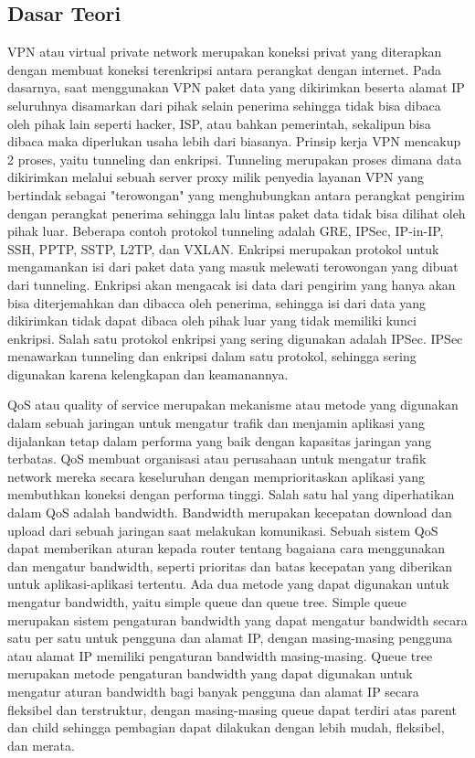 \subsection{Dasar Teori}
VPN atau virtual private network merupakan koneksi privat yang diterapkan dengan membuat koneksi terenkripsi antara perangkat dengan internet. Pada dasarnya, saat menggunakan VPN paket data yang dikirimkan beserta alamat IP seluruhnya disamarkan dari pihak selain penerima sehingga tidak bisa dibaca oleh pihak lain seperti hacker, ISP, atau bahkan pemerintah, sekalipun bisa dibaca maka diperlukan usaha lebih dari biasanya. Prinsip kerja VPN mencakup 2 proses, yaitu tunneling dan enkripsi. Tunneling merupakan proses dimana data dikirimkan melalui sebuah server proxy milik penyedia layanan VPN yang bertindak sebagai "terowongan" yang menghubungkan antara perangkat pengirim dengan perangkat penerima sehingga lalu lintas paket data tidak bisa dilihat oleh pihak luar. Beberapa contoh protokol tunneling adalah GRE, IPSec, IP-in-IP, SSH, PPTP, SSTP, L2TP, dan VXLAN. Enkripsi merupakan protokol untuk mengamankan isi dari paket data yang masuk melewati terowongan yang dibuat dari tunneling. Enkripsi akan mengacak isi data dari pengirim yang hanya akan bisa diterjemahkan dan dibacca oleh penerima, sehingga isi dari data yang dikirimkan tidak dapat dibaca oleh pihak luar yang tidak memiliki kunci enkripsi. Salah satu protokol enkripsi yang sering digunakan adalah IPSec. IPSec menawarkan tunneling dan enkripsi dalam satu protokol, sehingga sering digunakan karena kelengkapan dan keamanannya.

QoS atau quality of service merupakan mekanisme atau metode yang digunakan dalam sebuah jaringan untuk mengatur trafik dan menjamin aplikasi yang dijalankan tetap dalam performa yang baik dengan kapasitas jaringan yang terbatas. QoS membuat organisasi atau perusahaan untuk mengatur trafik network mereka secara keseluruhan dengan memprioritaskan aplikasi yang membuthkan koneksi dengan performa tinggi. Salah satu hal yang diperhatikan dalam QoS adalah bandwidth. Bandwidth merupakan kecepatan download dan upload dari sebuah jaringan saat melakukan komunikasi. Sebuah sistem QoS dapat memberikan aturan kepada router tentang bagaiana cara menggunakan dan mengatur bandwidth, seperti prioritas dan batas kecepatan yang diberikan untuk aplikasi-aplikasi tertentu. Ada dua metode yang dapat digunakan untuk mengatur bandwidth, yaitu simple queue dan queue tree. Simple queue merupakan sistem pengaturan bandwidth yang dapat mengatur bandwidth secara satu per satu untuk pengguna dan alamat IP, dengan masing-masing pengguna atau alamat IP memiliki pengaturan bandwidth masing-masing. Queue tree merupakan metode pengaturan bandwidth yang dapat digunakan untuk mengatur aturan bandwidth bagi banyak pengguna dan alamat IP secara fleksibel dan terstruktur, dengan masing-masing queue dapat terdiri atas parent dan child sehingga pembagian dapat dilakukan dengan lebih mudah, fleksibel, dan merata.
